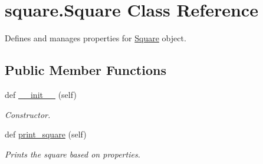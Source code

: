 \hypertarget{classsquare_1_1_square}{}\section{square.\+Square Class Reference}
\label{classsquare_1_1_square}


Defines and manages properties for \mbox{\hyperlink{classsquare_1_1_square}{Square}} object.  


\subsection*{Public Member Functions}
\begin{DoxyCompactItemize}
\item 
def \mbox{\hyperlink{classsquare_1_1_square_a32e445dc381a641dbc1d3136171952d1}{\+\_\+\+\_\+init\+\_\+\+\_\+}} (self)
\begin{DoxyCompactList}\small\item\em Constructor. \end{DoxyCompactList}\item 
def \mbox{\hyperlink{classsquare_1_1_square_a5a407995e42599755a899984eedef3f1}{print\+\_\+square}} (self)
\begin{DoxyCompactList}\small\item\em Prints the square based on properties. \end{DoxyCompactList}\end{DoxyCompactItemize}
